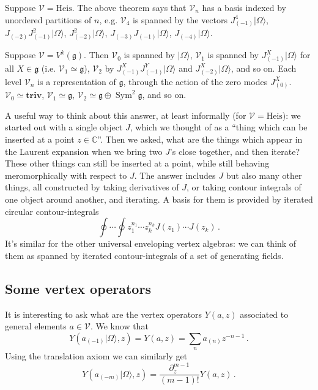 \documentclass[12pt,letterpaper,reqno]{amsart}
\numberwithin{equation}{section}
\newcommand{\fg}{{\mathfrak g}}
\newcommand{\Heis}{{\mathrm{Heis}}}
\newcommand{\bbC}{\ensuremath{\mathbb C}}
\newcommand\vac{{|\Omega\rangle}}
\newcommand\triv{{\mathbf {triv}}}
\newcommand{\vertex}{\mathcal{V}}
\DeclareMathOperator{\Sym}{Sym}
\begin{document}
\begin{example}
Suppose $\vertex = \Heis$. The above theorem says that $\vertex_n$ has a basis indexed by
unordered partitions of $n$, e.g. $\vertex_4$ is spanned by
the vectors
$J_{(-1)}^4 \vac$, $J_{(-2)} J_{(-1)}^2 \vac$, $J_{(-2)}^2 \vac$, $J_{(-3)} J_{(-1)} \vac$, $J_{(-4)} \vac$.
\end{example}

\begin{example}
Suppose $\vertex = V^k(\fg)$. Then $\vertex_0$ is spanned by $\vac$, $\vertex_1$ is spanned by $J^X_{(-1)} \vac$ for all $X \in \fg$
(i.e. $\vertex_1 \simeq \fg$), 
$\vertex_2$ by $J^X_{(-1)} J^Y_{(-1)} \vac$ and $J^X_{(-2)} \vac$,
and so on.
Each level $\vertex_n$ is a representation of $\fg$, through the
action of the zero modes $J^X_{(0)}$.
$\vertex_0 \simeq \triv$, $\vertex_1 \simeq \fg$, $\vertex_2 \simeq \fg \oplus \Sym^2 \fg$, and so on. 
\end{example}

A useful way to think about this answer, at least informally (for $\vertex = \Heis$): we started out with a single object $J$,
which we thought of as a ``thing which can be inserted at a point $z \in \bbC$''. Then we asked, what are the 
things which appear in the Laurent expansion when we bring two $J$'s close together, and then iterate?
These other things can still be inserted at a point, while still behaving meromorphically with respect to $J$.
The answer includes $J$ but also many other things, all constructed by taking derivatives of $J$, or taking 
contour integrals of one object around another, and iterating. A basis for them is provided by iterated circular 
contour-integrals 
\begin{equation}
  \oint \cdots \oint z_1^{n_1} \cdots z_k^{n_k} J(z_1) \cdots J(z_k) \, .
\end{equation}
It's similar for the other universal enveloping vertex algebras: we can think of them as spanned by iterated
contour-integrals of a set of generating fields.


\subsection{Some vertex operators}

It is interesting to ask what are the vertex
operators $Y(a,z)$ associated to general elements $a \in \vertex$.
We know that
\begin{equation}
  Y(a_{(-1)} \vac, z) = Y(a, z) = \sum_n a_{(n)} z^{-n-1} \, .
\end{equation}
Using the translation axiom we can similarly get
\begin{equation}
  Y(a_{(-m)} \vac, z) = \frac{\partial_z^{m-1}}{(m-1)!} Y(a, z) \, .
\end{equation}
\end{document}
